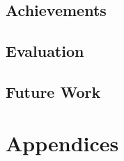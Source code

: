 \documentclass[a4paper,12pt]{report}
\begin{document}
\section{Achievements}


\section{Evaluation}

\section{Future Work}

\appendix

\printbibliography

\chapter{Appendices}

\end{document}
